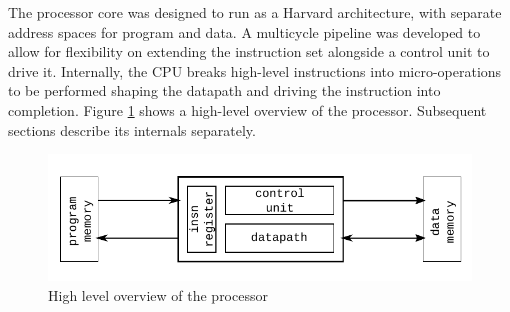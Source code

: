 The processor core was designed to run as a Harvard architecture, with separate
address spaces for program and data. A multicycle pipeline was developed to
allow for flexibility on extending the instruction set alongside a control unit
to drive it. Internally, the CPU breaks high-level instructions into 
micro-operations to be performed shaping the datapath and driving the
instruction into completion. Figure \ref{fig:processor} shows a high-level
overview of the processor.
Subsequent sections describe its internals separately.
\begin{figure}[h]
	\centering
	\includegraphics{../fig/processor.pdf}
	\caption{High level overview of the processor}
	\label{fig:processor}
\end{figure}
